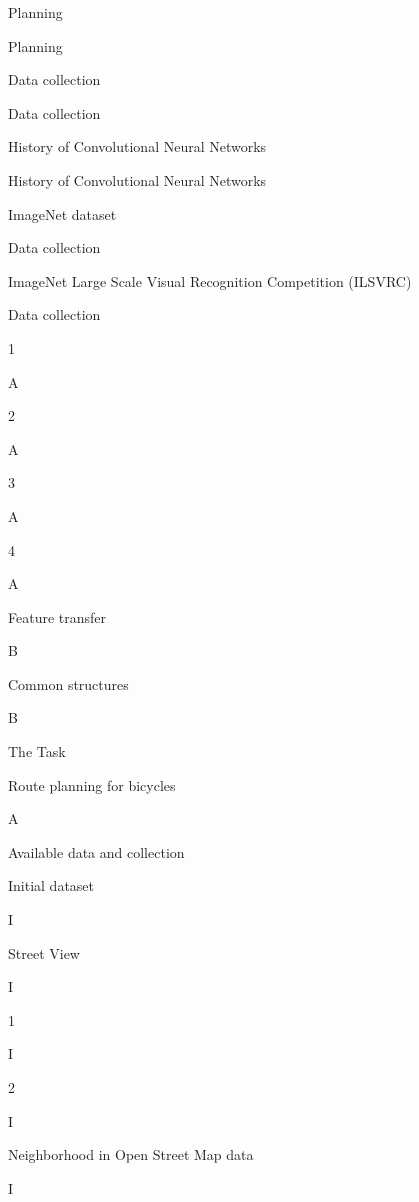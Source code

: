 \sec Planning

Planning

\secc Data collection

Data collection


\sec History of Convolutional Neural Networks 

History of Convolutional Neural Networks


\secc ImageNet dataset

Data collection

\secc ImageNet Large Scale Visual Recognition Competition (ILSVRC)

Data collection

1

A

2

A

3

A

4

A

\secc Feature transfer

B

\secc Common structures

B

\chap The Task

\sec Route planning for bicycles 

A

\sec Available data and collection 

\secc Initial dataset

I

\secc Street View

I

1

I

2

I

\secc Neighborhood in Open Street Map data

I

